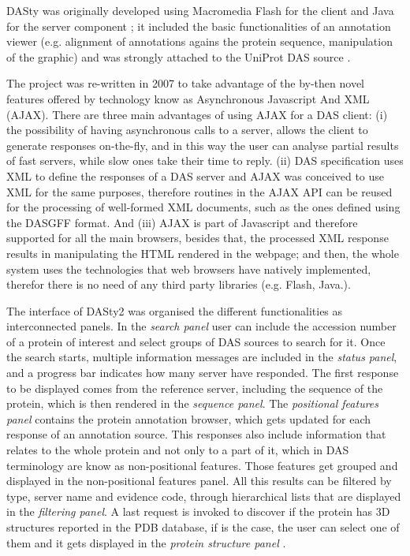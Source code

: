 DASty was originally developed using Macromedia Flash for the client and Java for the server component ; it included the basic functionalities of an annotation viewer (e.g.  alignment of annotations agains the protein sequence, manipulation of the graphic) and was strongly attached to the UniProt DAS source \cite{JON2005}. 

The project was re-written in 2007 to take advantage of the by-then novel features offered by technology know as Asynchronous Javascript And XML (AJAX). There are three main advantages of using AJAX for a DAS client: (i) the possibility of having asynchronous calls to a server, allows the client to generate responses on-the-fly, and in this way the user can analyse partial results of fast servers, while slow ones take their time to reply. (ii) DAS specification uses XML to define the responses of a DAS server and AJAX was conceived to use XML for the same purposes, therefore routines in the AJAX API can be reused for the processing of well-formed XML documents, such as the ones defined using the DASGFF format. And (iii) AJAX is part of Javascript and therefore supported for all the main browsers, besides that, the processed XML response results in manipulating the HTML rendered in the webpage; and then, the whole system uses the technologies that web browsers have natively implemented, therefor there is no need of any third party libraries (e.g. Flash, Java.).

The interface of DASty2 was organised the different functionalities as interconnected panels. In the \emph{search panel} user can include the accession number of a protein of interest and select groups of DAS sources to search for it. Once the search starts, multiple information messages are included in the \emph{status panel}, and a progress bar indicates how many server have responded. The first response to be displayed comes from the reference server, including the sequence of the protein, which is then rendered in the \emph{sequence panel}. The \emph{positional features panel} contains the protein annotation browser, which gets updated for each response of an annotation source. This responses also include information that relates to the whole protein and not only to a part of it, which in DAS terminology are know as non-positional features. Those features get grouped and displayed in the {non-positional features panel}. All this results can be filtered by type, server name and evidence code, through hierarchical lists that are displayed in the \emph{filtering panel}. A last request is invoked to discover if the protein has 3D structures reported in the PDB database, if is the case, the user can select one of them and it gets displayed in the \emph{protein structure panel} \cite{JIM2011}.

